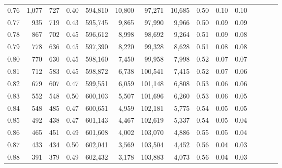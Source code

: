 \begin{tabular}{rrrcrrrrrrrrrrr}
0.76 &   1,077 &    727 &                                       0.40 &  594,810 &   10,800 &   97,271 &   10,685 &  0.50 &  0.10 &                         0.10 \\
0.77 &     935 &    719 &                                       0.43 &  595,745 &    9,865 &   97,990 &    9,966 &  0.50 &  0.09 &                         0.09 \\
0.78 &     867 &    702 &                                       0.45 &  596,612 &    8,998 &   98,692 &    9,264 &  0.51 &  0.09 &                         0.08 \\
0.79 &     778 &    636 &                                       0.45 &  597,390 &    8,220 &   99,328 &    8,628 &  0.51 &  0.08 &                         0.08 \\
0.80 &     770 &    630 &                                       0.45 &  598,160 &    7,450 &   99,958 &    7,998 &  0.52 &  0.07 &                         0.07 \\
0.81 &     712 &    583 &                                       0.45 &  598,872 &    6,738 &  100,541 &    7,415 &  0.52 &  0.07 &                         0.06 \\
0.82 &     679 &    607 &                                       0.47 &  599,551 &    6,059 &  101,148 &    6,808 &  0.53 &  0.06 &                         0.06 \\
0.83 &     552 &    548 &                                       0.50 &  600,103 &    5,507 &  101,696 &    6,260 &  0.53 &  0.06 &                         0.05 \\
0.84 &     548 &    485 &                                       0.47 &  600,651 &    4,959 &  102,181 &    5,775 &  0.54 &  0.05 &                         0.05 \\
0.85 &     492 &    438 &                                       0.47 &  601,143 &    4,467 &  102,619 &    5,337 &  0.54 &  0.05 &                         0.04 \\
0.86 &     465 &    451 &                                       0.49 &  601,608 &    4,002 &  103,070 &    4,886 &  0.55 &  0.05 &                         0.04 \\
0.87 &     433 &    434 &                                       0.50 &  602,041 &    3,569 &  103,504 &    4,452 &  0.56 &  0.04 &                         0.03 \\
0.88 &     391 &    379 &                                       0.49 &  602,432 &    3,178 &  103,883 &    4,073 &  0.56 &  0.04 &                         0.03 \\

\end{tabular}

